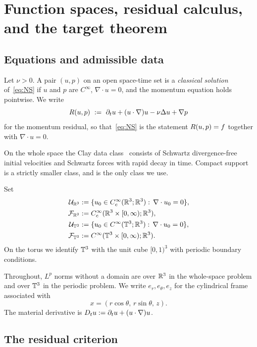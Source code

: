 \section{Function spaces, residual calculus, and the target theorem}
\label{sec:setup}

\subsection{Equations and admissible data}

Let $\nu>0$. A pair $(u,p)$ on an open space-time set is a \emph{classical solution} of~\eqref{eq:NS} if $u$ and $p$ are $C^\infty$, $\nabla\cdot u=0$, and the momentum equation holds pointwise. We write
\[
R(u,p)\ :=\ \partial_t u+(u\cdot\nabla)u-\nu\Delta u+\nabla p
\]
for the momentum residual, so that~\eqref{eq:NS} is the statement $R(u,p)=f$ together with $\nabla\cdot u=0$.

On the whole space the {C}lay data class~\cite{fefferman2000} consists of Schwartz divergence-free initial velocities and Schwartz forces with rapid decay in time. Compact support is a strictly smaller class, and is the only class we use.

\begin{definition}
\label{def:data}
Set
\begin{align*}
\mathcal U_{\mathbb{R}^3}
&:=\{u_0\in C_c^\infty(\mathbb{R}^3;\mathbb{R}^3):\,\nabla\cdot u_0=0\},\\
\mathcal F_{\mathbb{R}^3}
&:=C_c^\infty(\mathbb{R}^3\times[0,\infty);\mathbb{R}^3),\\
\mathcal U_{\mathbb{T}^3}
&:=\{u_0\in C^\infty(\mathbb{T}^3;\mathbb{R}^3):\,\nabla\cdot u_0=0\},\\
\mathcal F_{\mathbb{T}^3}
&:=C^\infty(\mathbb{T}^3\times[0,\infty);\mathbb{R}^3).
\end{align*}
On the torus we identify $\mathbb{T}^3$ with the unit cube $[0,1)^3$ with periodic boundary conditions.
\end{definition}

\begin{notation}
Throughout, $L^p$ norms without a domain are over $\mathbb{R}^3$ in the whole-space problem and over $\mathbb{T}^3$ in the periodic problem. We write $e_r,e_\theta,e_z$ for the cylindrical frame associated with
\[
x=(r\cos\theta,\, r\sin\theta,\, z).
\]
The material derivative is $D_t u:=\partial_t u+(u\cdot\nabla)u$.
\end{notation}

\subsection{The residual criterion}

